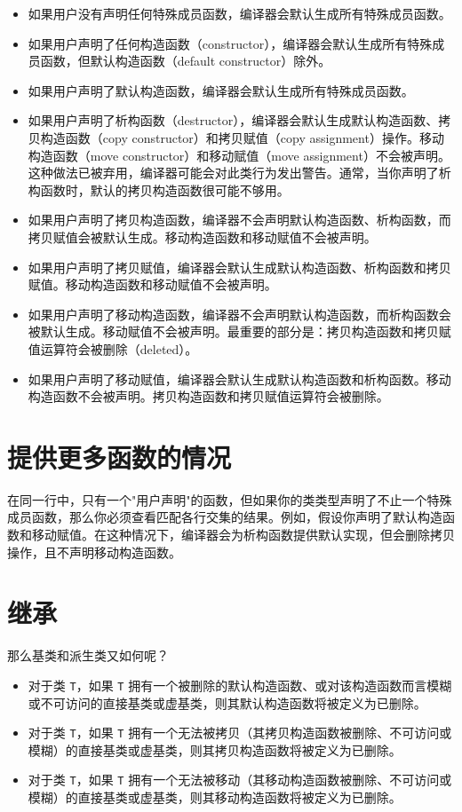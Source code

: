 \begin{itemize}
\item 如果用户没有声明任何特殊成员函数，编译器会默认生成所有特殊成员函数。
\item 如果用户声明了任何构造函数（constructor），编译器会默认生成所有特殊成员函数，但默认构造函数（default constructor）除外。
\item 如果用户声明了默认构造函数，编译器会默认生成所有特殊成员函数。
\item 如果用户声明了析构函数（destructor），编译器会默认生成默认构造函数、拷贝构造函数（copy constructor）和拷贝赋值（copy assignment）操作。移动构造函数（move constructor）和移动赋值（move assignment）不会被声明。这种做法已被弃用，编译器可能会对此类行为发出警告。通常，当你声明了析构函数时，默认的拷贝构造函数很可能不够用。
\item 如果用户声明了拷贝构造函数，编译器不会声明默认构造函数、析构函数，而拷贝赋值会被默认生成。移动构造函数和移动赋值不会被声明。
\item 如果用户声明了拷贝赋值，编译器会默认生成默认构造函数、析构函数和拷贝赋值。移动构造函数和移动赋值不会被声明。
\item 如果用户声明了移动构造函数，编译器不会声明默认构造函数，而析构函数会被默认生成。移动赋值不会被声明。最重要的部分是：拷贝构造函数和拷贝赋值运算符会被删除（deleted）。
\item 如果用户声明了移动赋值，编译器会默认生成默认构造函数和析构函数。移动构造函数不会被声明。拷贝构造函数和拷贝赋值运算符会被删除。
\end{itemize}

\section{提供更多函数的情况}

在同一行中，只有一个"用户声明"的函数，但如果你的类类型声明了不止一个特殊成员函数，那么你必须查看匹配各行交集的结果。例如，假设你声明了默认构造函数和移动赋值。在这种情况下，编译器会为析构函数提供默认实现，但会删除拷贝操作，且不声明移动构造函数。

\section{继承}

那么基类和派生类又如何呢？

\begin{itemize}
\item 对于类 \texttt{T}，如果 \texttt{T} 拥有一个被删除的默认构造函数、或对该构造函数而言模糊或不可访问的直接基类或虚基类，则其默认构造函数将被定义为已删除。
\item 对于类 \texttt{T}，如果 \texttt{T} 拥有一个无法被拷贝（其拷贝构造函数被删除、不可访问或模糊）的直接基类或虚基类，则其拷贝构造函数将被定义为已删除。
\item 对于类 \texttt{T}，如果 \texttt{T} 拥有一个无法被移动（其移动构造函数被删除、不可访问或模糊）的直接基类或虚基类，则其移动构造函数将被定义为已删除。
\end{itemize}

